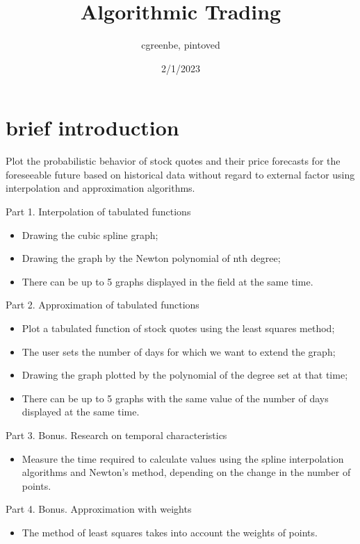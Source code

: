 \documentclass[12pt]{article}
\title{Algorithmic Trading}
\author{cgreenbe, pintoved}
\date{2/1/2023}
\begin{document}
\maketitle

\newpage
\section{brief introduction}
Plot the probabilistic behavior of stock quotes and their price forecasts for the foreseeable future 
based on historical data without regard to external factor
using interpolation and approximation algorithms.

Part 1. Interpolation of tabulated functions
\begin{itemize}
  \item Drawing the cubic spline graph;
  \item Drawing the graph by the Newton polynomial of nth degree;
  \item There can be up to 5 graphs displayed in the field at the same time.
\end{itemize}

Part 2. Approximation of tabulated functions
\begin{itemize}
  \item Plot a tabulated function of stock quotes using the least squares method;
  \item The user sets the number of days for which we want to extend the graph;
  \item Drawing the graph plotted by the polynomial of the degree set at that time;
  \item There can be up to 5 graphs with the same value of the number of days displayed at the same time.
\end{itemize}

Part 3. Bonus. Research on temporal characteristics
\begin{itemize}
  \item Measure the time required to calculate values using the spline interpolation algorithms
  and Newton's method, depending on the change in the number of points.
\end{itemize}

Part 4. Bonus. Approximation with weights
\begin{itemize}
  \item The method of least squares takes into account the weights of points.
\end{itemize}
\end{document}
